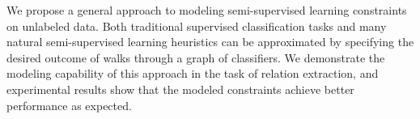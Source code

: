 We propose a general approach to modeling semi-supervised learning constraints on unlabeled data. Both traditional supervised classification tasks and many natural semi-supervised learning heuristics can be approximated by specifying the desired outcome of walks through a graph of classifiers. We demonstrate the modeling capability of this approach in the task of relation extraction, and experimental results show that the modeled constraints achieve better performance as expected.
